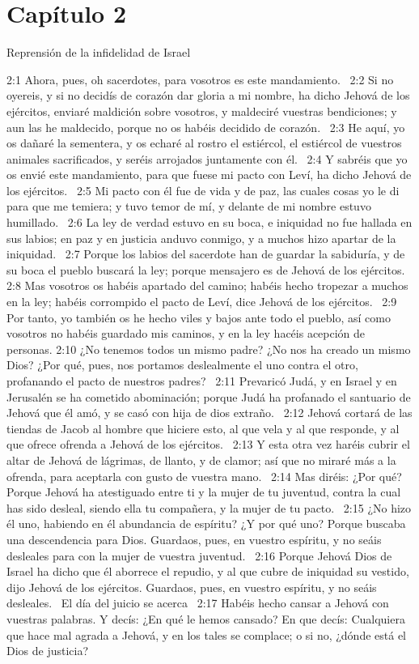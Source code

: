 \section*{Capítulo 2 }
Reprensión de la infidelidad de Israel  

2:1 Ahora, pues, oh sacerdotes, para vosotros es este mandamiento.  
2:2 Si no oyereis, y si no decidís de corazón dar gloria a mi nombre, ha dicho Jehová de los ejércitos, enviaré maldición sobre vosotros, y maldeciré vuestras bendiciones; y aun las he maldecido, porque no os habéis decidido de corazón.  
2:3 He aquí, yo os dañaré la sementera, y os echaré al rostro el estiércol, el estiércol de vuestros animales sacrificados, y seréis arrojados juntamente con él.  
2:4 Y sabréis que yo os envié este mandamiento, para que fuese mi pacto con Leví, ha dicho Jehová de los ejércitos.  
2:5 Mi pacto con él fue de vida y de paz, las cuales cosas yo le di para que me temiera; y tuvo temor de mí, y delante de mi nombre estuvo humillado.  
2:6 La ley de verdad estuvo en su boca, e iniquidad no fue hallada en sus labios; en paz y en justicia anduvo conmigo, y a muchos hizo apartar de la iniquidad.  
2:7 Porque los labios del sacerdote han de guardar la sabiduría, y de su boca el pueblo buscará la ley; porque mensajero es de Jehová de los ejércitos.  
2:8 Mas vosotros os habéis apartado del camino; habéis hecho tropezar a muchos en la ley; habéis corrompido el pacto de Leví, dice Jehová de los ejércitos.  
2:9 Por tanto, yo también os he hecho viles y bajos ante todo el pueblo, así como vosotros no habéis guardado mis caminos, y en la ley hacéis acepción de personas. 
2:10 ¿No tenemos todos un mismo padre? ¿No nos ha creado un mismo Dios? ¿Por qué, pues, nos portamos deslealmente el uno contra el otro, profanando el pacto de nuestros padres?  
2:11 Prevaricó Judá, y en Israel y en Jerusalén se ha cometido abominación; porque Judá ha profanado el santuario de Jehová que él amó, y se casó con hija de dios extraño.  
2:12 Jehová cortará de las tiendas de Jacob al hombre que hiciere esto, al que vela y al que responde, y al que ofrece ofrenda a Jehová de los ejércitos.  
2:13 Y esta otra vez haréis cubrir el altar de Jehová de lágrimas, de llanto, y de clamor; así que no miraré más a la ofrenda, para aceptarla con gusto de vuestra mano.  
2:14 Mas diréis: ¿Por qué? Porque Jehová ha atestiguado entre ti y la mujer de tu juventud, contra la cual has sido desleal, siendo ella tu compañera, y la mujer de tu pacto.  
2:15 ¿No hizo él uno, habiendo en él abundancia de espíritu? ¿Y por qué uno? Porque buscaba una descendencia para Dios. Guardaos, pues, en vuestro espíritu, y no seáis desleales para con la mujer de vuestra juventud.  
2:16 Porque Jehová Dios de Israel ha dicho que él aborrece el repudio, y al que cubre de iniquidad su vestido, dijo Jehová de los ejércitos. Guardaos, pues, en vuestro espíritu, y no seáis desleales.  
El día del juicio se acerca  
2:17 Habéis hecho cansar a Jehová con vuestras palabras. Y decís: ¿En qué le hemos cansado? En que decís: Cualquiera que hace mal agrada a Jehová, y en los tales se complace; o si no, ¿dónde está el Dios de justicia?  
